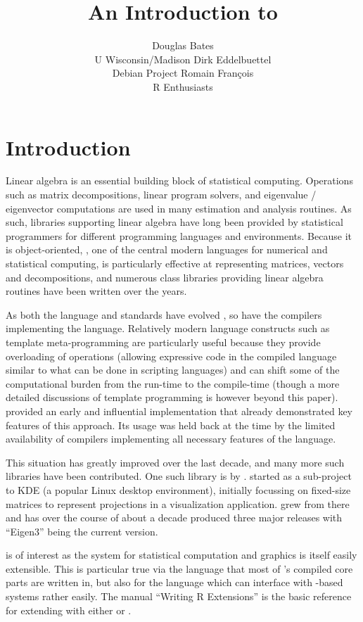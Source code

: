 \documentclass[shortnames,article]{jss}
\author{Douglas Bates\\U Wisconsin/Madison \And Dirk Eddelbuettel\\Debian Project \And Romain Fran\c{c}ois\\R Enthusiasts}
\title{An Introduction to \pkg{RcppEigen}}
\begin{document}

\section{Introduction}
\label{sec:intro}

Linear algebra is an essential building block of statistical
computing.  Operations such as matrix decompositions, linear program
solvers, and eigenvalue / eigenvector computations are used in many
estimation and analysis routines. As such, libraries supporting linear
algebra have long been provided by statistical programmers for
different programming languages and environments.  Because it is
object-oriented, , one of the central modern languages
for numerical and statistical computing, is particularly effective at
representing matrices, vectors and decompositions, and numerous class
libraries providing linear algebra routines have been written over the
years.

As both the  language and standards have evolved
\citep{Meyers:2005:EffectiveC++,Meyers:1995:MoreEffectiveC++}, so have the
compilers implementing the language.  Relatively modern language constructs
such as template meta-programming are particularly useful because they provide
overloading of operations (allowing expressive code in the compiled language
similar to what can be done in scripting languages) and can shift some of the
computational burden from the run-time to the compile-time (though a more
detailed discussions of template programming is however beyond this
paper). \cite{Veldhuizen:1998:Blitz} provided an early and influential
implementation that already demonstrated key features of this approach.  Its
usage was held back at the time by the limited availability of
compilers implementing all necessary features of the 
language.

This situation has greatly improved over the last decade, and many more such
libraries have been contributed. One such  library is
 by \citet*{Eigen:Web}.  started as a sub-project to
KDE (a popular Linux desktop environment), initially focussing on fixed-size
matrices to represent projections in a visualization application. 
grew from there and has over the course of about a decade produced three
major releases with ``Eigen3'' being the current version.

 is of interest as the  system for statistical
computation and graphics \citep{R:Main} is itself easily extensible. This is
particular true via the  language that most of 's
compiled core parts are written in, but also for the  language
which can interface with -based systems rather easily. The manual
``Writing R Extensions'' \citep{R:Extensions} is the basic reference for
extending  with either  or .
\end{document}
